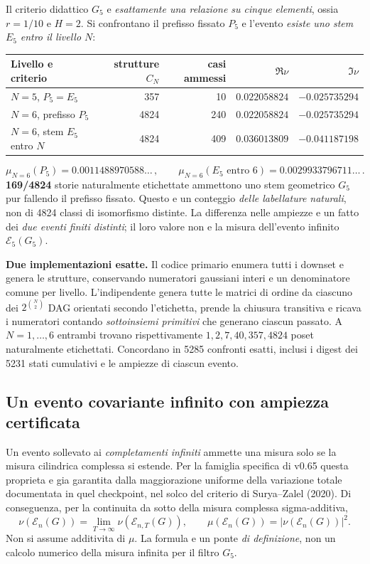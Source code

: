\documentclass[11pt,a4paper]{article}
\begin{document}
Il criterio didattico $G_5$ e \emph{esattamente una relazione su cinque elementi}, ossia $r=1/10$ e $H=2$. Si confrontano il prefisso fissato $P_5$ e l'evento \emph{esiste uno stem} $E_5$ \emph{entro il livello $N$}:
\begin{center}\small
\begin{tabular}{lrrrr}
\toprule
Livello e criterio & strutture $C_N$ & casi ammessi & $\Re\nu$ & $\Im\nu$ \\\midrule
$N=5$, $P_5=E_5$ & 357 & 10 & $0.022058824$ & $-0.025735294$\\
$N=6$, prefisso $P_5$ & 4824 & 240 & $0.022058824$ & $-0.025735294$\\
$N=6$, stem $E_5$ entro $N$ & 4824 & 409 & $0.036013809$ & $-0.041187198$\\
\bottomrule
\end{tabular}
\end{center}
\begin{equation}
 \boxed{\mu_{N=6}(P_5)=0.0011488970588\ldots\,,\qquad
 \mu_{N=6}(E_5\text{ entro }6)=0.0029933796711\ldots}\,.
 \tag{CV.4}
\end{equation}
\textbf{169/4824} storie naturalmente etichettate ammettono uno stem geometrico $G_5$ pur fallendo il prefisso fissato. Questo e un conteggio \emph{delle labellature naturali}, non di 4824 classi di isomorfismo distinte. La differenza nelle ampiezze e un fatto dei \emph{due eventi finiti distinti}; il loro valore non e la misura dell'evento infinito $\mathcal E_5(G_5)$.

\textbf{Due implementazioni esatte.} Il codice primario enumera tutti i downset e genera le strutture, conservando numeratori gaussiani interi e un denominatore comune per livello. L'indipendente genera tutte le matrici di ordine da ciascuno dei $2^{\binom N2}$ DAG orientati secondo l'etichetta, prende la chiusura transitiva e ricava i numeratori contando \emph{sottoinsiemi primitivi} che generano ciascun passato. A $N=1,\ldots,6$ entrambi trovano rispettivamente $1,2,7,40,357,4824$ poset naturalmente etichettati. Concordano in 5285 confronti esatti, inclusi i digest dei 5231 stati cumulativi e le ampiezze di ciascun evento.

\clearpage
\subsection*{Un evento covariante infinito con ampiezza certificata}
Un evento sollevato ai \emph{completamenti infiniti} ammette una misura solo se la misura cilindrica complessa si estende. Per la famiglia specifica di v0.65 questa proprieta e gia garantita dalla maggiorazione uniforme della variazione totale documentata in quel checkpoint, nel solco del criterio di Surya--Zalel (2020). Di conseguenza, per la continuita da sotto della misura complessa sigma-additiva,
\begin{equation}
 \nu(\mathcal E_n(G))=\lim_{T\to\infty}\nu(\mathcal E_{n,T}(G)),\qquad
 \mu(\mathcal E_n(G))=|\nu(\mathcal E_n(G))|^2.
 \tag{CV.5}
\end{equation}
Non si assume additivita di $\mu$. La formula e un ponte \emph{di definizione}, non un calcolo numerico della misura infinita per il filtro $G_5$.
\end{document}
